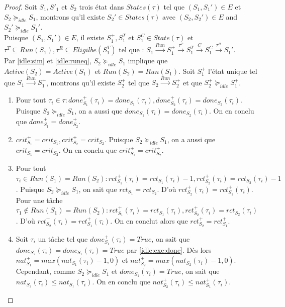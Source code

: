\documentclass[11pt,a4paper,oneside]{book}
\theoremstyle{break}
\theoremstyle{breakplain}
\begin{document}
\begin{proof}
Soit $S_1, S'_1$ et $S_2$ trois état dans $States(\tau)$ tel que $(S_1, S_1') \in E$ et $S_2 \succeq_{idle}S_1$, montrons qu'il existe $S_2' \in States(\tau)$ avec $(S_2, S_2') \in E$ and $S_2' \succeq_{idle} S_1'$.\\

Puisque $(S_1, S_1') \in E$, il existe $S^{+}_1, S^{T}_1$ et $S^{C}_1 \in State(\tau)$ et $\tau^T \subseteq Run(S_1),\tau^R \subseteq Eligilbe(S^{T}_1) $ tel que : $S_1\xrightarrow{Run}S^{+}_1\xrightarrow{\tau^T}S^{T}_1\xrightarrow{C}S^{C}_1\xrightarrow{\tau^R}S_1'$.\\

Par \autoref{idle:sim} et \autoref{idle:runeq}, $S_2 \succeq_{idle} S_1$ implique que $Active(S_2) = Active(S_1)$ et $Run(S_2) = Run(S_1)$. Soit $S^+_1$ l'état unique tel que $S_1\xrightarrow{Run}S^{+}_1$, montrons qu'il existe $S^+_2$ tel que $S_2\xrightarrow{Run}S^{+}_2$ et que $S^+_2 \succeq_{idle} S^+_1$.
\begin{enumerate}


\item \label{idle:exe:done} Pour tout  $\tau_i \in \tau : done_{S_1}^+(\tau_i) = done_{S_1}(\tau_i), done_{S_2}^+(\tau_i) = done_{S_2}(\tau_i)$. Puisque $S_2 \succeq_{idle} S_1$, on a aussi que $done_{S_1}(\tau_i) = done_{S_2}(\tau_i)$. On en conclu que $done_{S_1}^+ = done_{S_2}^+$.

\item $crit_{S_1}^+ = crit_{S_1}, crit_{S_2}^+ = crit_{S_2}$. Puisque $S_2 \succeq_{idle} S_1$, on a aussi que $crit_{S_1} = crit_{S_2}$. On en conclu que $crit_{S_1}^+ = crit_{S_2}^+$.

\item Pour tout $\tau_i \in Run(S_1) = Run(S_2) : rct_{S_1}^+(\tau_i) = rct_{S_1}(\tau_i) -1, rct_{S_2}^+(\tau_i) = rct_{S_2}(\tau_i) -1$. Puisque $S_2 \succeq_{idle} S_1$, on sait que $rct_{S_1} = rct_{S_2}$. D'où $rct_{S_2}^+(\tau_i) = rct_{S_1}^+(\tau_i)$.\\
Pour une tâche $\tau_1 \notin Run(S_1) = Run(S_2) : rct_{S_1}^+(\tau_i) = rct_{S_1}(\tau_i), rct_{S_2}^+(\tau_i) = rct_{S_2}(\tau_i)$. D'où $rct_{S_2}^+(\tau_i) = rct_{S_1}^+(\tau_i)$. On en conclut alors que $rct_{S_2}^+ = rct_{S_1}^+$.

\item Soit $\tau_i$ un tâche tel que $done_{S_1}^+(\tau_i) = True$, on sait que $done_{S_2}(\tau_i) = done_{S_1}(\tau_i) = True$ par \autoref{idle:exe:done}. Dès lors $nat_{S_1}^+ = max(nat_{S_1}(\tau_i)-1, 0)$ et $nat_{S_2}^+ = max(nat_{S_2}(\tau_i)-1, 0)$. Cependant, comme $S_2 \succeq_{idle} S_1$ et $done_{S_1}(\tau_i) = True$, on sait que $nat_{S_2}(\tau_i) \leq nat_{S_1}(\tau_i)$. On en conclu que $nat_{S_2}^+(\tau_i) \leq nat_{S_1}^+(\tau_i)$.


\end{enumerate}
\end{proof}
\end{document}
